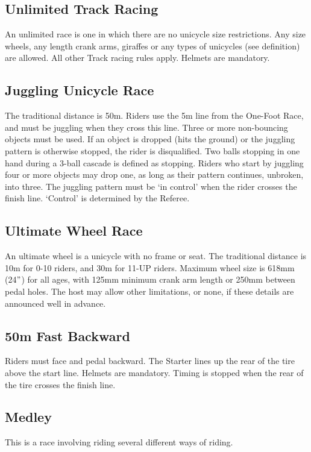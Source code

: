 \subsection{Unlimited Track Racing}
An unlimited race is one in which there are no unicycle size restrictions.
Any size wheels, any length crank arms, giraffes or any types of unicycles (see definition) are allowed.
All other Track racing rules apply.
Helmets are mandatory.

\subsection{Juggling Unicycle Race}
The traditional distance is 50m.
Riders use the 5m line from the One-Foot Race, and must be juggling when they cross this line.
Three or more non-bouncing objects must be used.
If an object is dropped (hits the ground) or the juggling pattern is otherwise stopped, the rider is disqualified.
Two balls stopping in one hand during a 3-ball cascade is defined as stopping.
Riders who start by juggling four or more objects may drop one, as long as their pattern continues, unbroken, into three.
The juggling pattern must be ‘in control’ when the rider crosses the finish line.
‘Control’ is determined by the Referee.

\subsection{Ultimate Wheel Race}
An ultimate wheel is a unicycle with no frame or seat.
The traditional distance is 10m for 0-10 riders, and 30m for 11-UP riders.
Maximum wheel size is 618mm (24$"$) for all ages, with 125mm minimum crank arm length or 250mm between pedal holes.
The host may allow other limitations, or none, if these details are announced well in advance.

\subsection{50m Fast Backward}
Riders must face and pedal backward.
The Starter lines up the rear of the tire above the start line.
Helmets are mandatory.
Timing is stopped when the rear of the tire crosses the finish line.

\subsection{Medley}
This is a race involving riding several different ways of riding.

